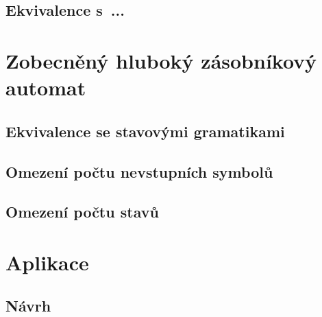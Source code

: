 \section{Ekvivalence s~...}

\chapter{Zobecněný hluboký zásobníkový automat}


\section{Ekvivalence se stavovými gramatikami}


\section{Omezení počtu nevstupních symbolů}


\section{Omezení počtu stavů}


\chapter{Aplikace}

\section{Návrh}

